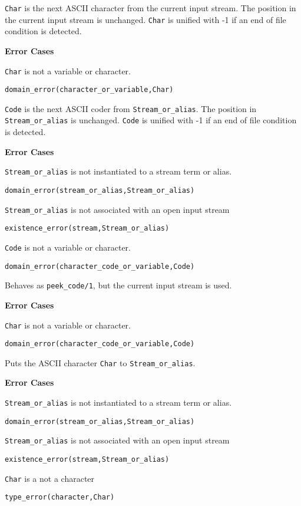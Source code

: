 \begin{description}
{\tt Char} is the next ASCII character from the current input stream.
The position in the current input stream is unchanged.  {\tt Char} is
unified with -1 if an end of file condition is detected.

{\bf Error Cases}
\bi
\item 	{\tt Char} is not a variable or character.
\bi
\item 	{\tt domain\_error(character\_or\_variable,Char)}
\ei
\ei

{\tt Code} is the next ASCII coder from {\tt Stream\_or\_alias}.
The position in {\tt Stream\_or\_alias} is unchanged.  {\tt Code} is
unified with -1 if an end of file condition is detected.

{\bf Error Cases}
\bi
\item 	{\tt Stream\_or\_alias} is not instantiated to a stream term or alias.
\bi
\item 	{\tt domain\_error(stream\_or\_alias,Stream\_or\_alias)}
\ei
\item 	{\tt Stream\_or\_alias} is not associated with an open input stream
\bi
\item 	{\tt existence\_error(stream,Stream\_or\_alias)}
\ei
\item 	{\tt Code} is not a variable or character.
\bi
\item 	{\tt domain\_error(character\_code\_or\_variable,Code)}
\ei
\ei

Behaves as {\tt peek\_code/1}, but the current input stream is used.

{\bf Error Cases}
\bi
\item 	{\tt Char} is not a variable or character.
\bi
\item 	{\tt domain\_error(character\_code\_or\_variable,Code)}
\ei
\ei


Puts the ASCII character {\tt Char} to {\tt Stream\_or\_alias}.

{\bf Error Cases}
\bi
\item 	{\tt Stream\_or\_alias} is not instantiated to a stream term or alias.
\bi
\item 	{\tt domain\_error(stream\_or\_alias,Stream\_or\_alias)}
\ei
\item 	{\tt Stream\_or\_alias} is not associated with an open input stream
\bi
\item 	{\tt existence\_error(stream,Stream\_or\_alias)}
\ei
\item 	{\tt Char} is a not a character
\bi
\item 	{\tt type\_error(character,Char)}
\ei
\ei


\end{description}
